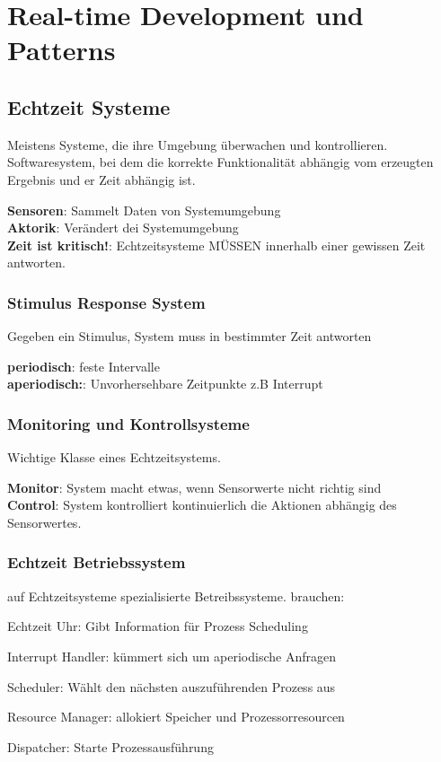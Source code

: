 \chapter{Real-time Development und Patterns}

\section{Echtzeit Systeme}
Meistens Systeme, die ihre Umgebung überwachen und kontrollieren.
Softwaresystem, bei dem die korrekte Funktionalität abhängig vom erzeugten Ergebnis und er
Zeit abhängig ist.

\textbf{Sensoren}: Sammelt Daten von Systemumgebung\\
\textbf{Aktorik}: Verändert dei Systemumgebung\\
\textbf{Zeit ist kritisch!}: Echtzeitsysteme MÜSSEN innerhalb einer gewissen Zeit antworten.

\subsection{Stimulus Response System}
Gegeben ein Stimulus, System muss in bestimmter Zeit antworten

\textbf{periodisch}: feste Intervalle\\
\textbf{aperiodisch:}: Unvorhersehbare Zeitpunkte z.B Interrupt

\subsection{Monitoring und Kontrollsysteme}
Wichtige Klasse eines Echtzeitsystems.

\textbf{Monitor}: System macht etwas, wenn Sensorwerte nicht richtig sind\\
\textbf{Control}: System kontrolliert kontinuierlich die Aktionen abhängig des Sensorwertes.

\subsection{Echtzeit Betriebssystem}
auf Echtzeitsysteme spezialisierte Betreibssysteme.
brauchen: \\
\begin{compactitem}
    \item Echtzeit Uhr: Gibt Information für Prozess Scheduling
    \item Interrupt Handler: kümmert sich um aperiodische Anfragen
    \item Scheduler: Wählt den nächsten auszuführenden Prozess aus
    \item Resource Manager: allokiert Speicher und Prozessorresourcen
    \item Dispatcher: Starte Prozessausführung
\end{compactitem}

